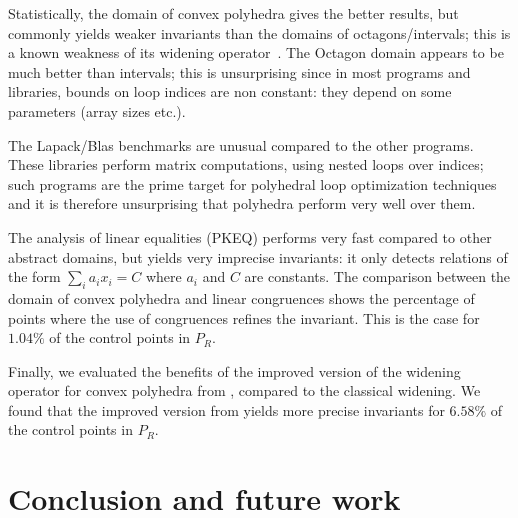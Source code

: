 \documentclass{entcs}
\begin{document}
Statistically, the domain of convex polyhedra gives the better results, but
commonly yields weaker invariants than the domains of octagons/intervals;
this is a known weakness of its widening operator~\cite{Monniaux_LeGuen2011}. 
The Octagon domain appears to be much better than intervals; this is
unsurprising since in most programs and libraries, bounds on loop indices are
non constant: they depend on some parameters (array sizes etc.).

The Lapack/Blas benchmarks are unusual compared to the other programs. These libraries perform matrix computations, using nested loops over indices; such programs are the prime target for polyhedral loop optimization techniques and it is therefore unsurprising that polyhedra perform very well over them.

The analysis of linear equalities (PKEQ) performs very fast compared
to other abstract domains, but yields very imprecise invariants:
it only detects relations of the form $\sum_i a_i x_i = C$ where $a_i$ and $C$ are constants.
The comparison between the domain of convex polyhedra and linear congruences
shows the percentage of points where the use of congruences refines the
invariant. This is the case for $1.04\%$ of the control points in $P_R$.

Finally, we evaluated the benefits of the improved version of the widening
operator for convex polyhedra from \citet{BagnaraHRZ05SCP}, compared to the
classical widening. We found that the improved version from
\citet{BagnaraHRZ05SCP} yields more precise invariants for $6.58\%$ of the
control points in $P_R$.

\section{Conclusion and future work}



	

\end{document}
